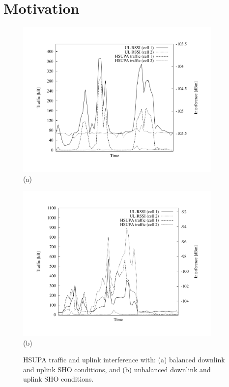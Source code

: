 \section{Motivation \label{sec:07-Motivation}}

\begin{figure}
\centering

\includegraphics[width=0.9\textwidth]{07-experimental_evaluation-sho_balancing/img/network_normal}\\\vskip -0.3in \hskip -0.4cm (a)

\includegraphics[width=0.9\textwidth]{07-experimental_evaluation-sho_balancing/img/network_problem}\\\vskip -0.3in \hskip 0.2cm (b)

\caption{HSUPA traffic and uplink interference with: (a) balanced downlink
and uplink SHO conditions, and (b) unbalanced downlink and uplink
SHO conditions.\label{fig:07-Problem_illustration}}
\end{figure}


